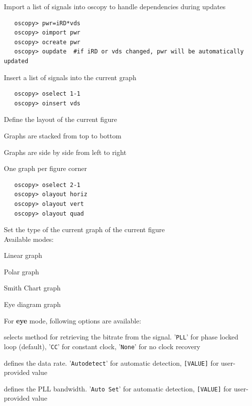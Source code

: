 \documentclass[a4paper,11pt]{report}
\renewenvironment{description}{%
\begin{basedescript}{%
\renewcommand{\makelabel}[1]{\bfseries##1}%
}%
}{%
\end{basedescript}%
}
\begin{document}
   Import a list of signals into oscopy to handle dependencies during updates
\begin{lstlisting}
   oscopy> pwr=iRD*vds
   oscopy> oimport pwr
   oscopy> ocreate pwr
   oscopy> oupdate  #if iRD or vds changed, pwr will be automatically updated
\end{lstlisting}

   Insert a list of signals into the current graph
\begin{lstlisting}
   oscopy> oselect 1-1
   oscopy> oinsert vds
\end{lstlisting}

   Define the layout of the current figure
   \begin{description}
   \item[olayout horiz] Graphs are stacked from top to bottom
   \item[olayout vert] Graphs are side by side from left to right
   \item[olayout quad] One graph per figure corner
   \end{description}
\begin{lstlisting}
   oscopy> oselect 2-1
   oscopy> olayout horiz
   oscopy> olayout vert
   oscopy> olayout quad
\end{lstlisting}

   Set the type of the current graph of the current figure\\
   Available modes:
   \begin{description}
   \item[omode lin]      Linear graph
   \item[omode polar]      Polar graph
   \item[omode smith]      Smith Chart graph
   \item[omode eye]      Eye diagram graph
   \end{description}
   For \textbf{eye} mode, following options are available:
   \begin{description}
   \item[ClockRecovery] selects method for retrieving the bitrate from the signal. '\texttt{PLL}' for phase locked loop (default), '\texttt{CC}' for constant clock, '\texttt{None}' for no clock recovery
   \item[DRsel] defines the data rate. '\texttt{Autodetect}' for automatic detection, \texttt{[VALUE]} for user-provided value
   \item[BWsel] defines the PLL bandwidth. '\texttt{Auto Set}' for automatic detection, \texttt{[VALUE]} for user-provided value
   \end{description}
\end{document}
